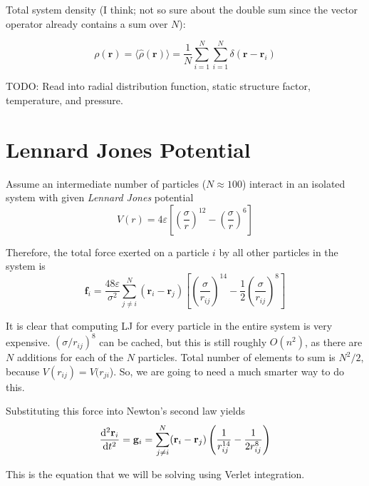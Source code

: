 \documentclass{article}
\begin{document}
Total system density (I think; not so sure about the double sum since the vector operator already contains a sum over $N$):

\begin{equation}
    \rho (\mathbf{r}) = \langle \hat{\rho}(\mathbf{r}) \rangle = \frac{1}{N}\sum_{i=1}^N \sum_{i=1}^N \delta(\mathbf{r} - \mathbf{r}_i)
\end{equation}

TODO: Read into radial distribution function, static structure factor, temperature, and pressure.

\section{Lennard Jones Potential}

Assume an intermediate number of particles ($N\approx 100$) interact in an isolated system with given \textit{Lennard Jones} potential
\begin{equation}
    V(r) = 4\varepsilon \left[ \left( \frac{\sigma}{r} \right)^{12} - \left( \frac{\sigma}{r} \right)^6 \right]
\end{equation}

Therefore, the total force exerted on a particle $i$ by all other particles in the system is
\begin{equation}
    \mathbf{f}_i = \frac{48\varepsilon}{\sigma^2} \sum_{j \neq i}^N (\mathbf{r}_i - \mathbf{r}_j)
    \left[ \left( \frac{\sigma}{r_{ij}} \right)^{14} - \frac{1}{2} \left( \frac{\sigma}{r_{ij}} \right)^8 \right]
\end{equation}

It is clear that computing LJ for every particle in the entire system is very expensive. $(\sigma/r_{ij})^8$ can be cached, but this is still roughly $O(n^2)$, as there are $N$ additions for each of the $N$ particles. Total number of elements to sum is $N^2/2$, because $V(r_{ij}) = V(r_{ji}$). So, we are going to need a much smarter way to do this.

Substituting this force into Newton's second law yields
\begin{equation}
    \dv[2]{\mathbf{r}_i}{t} = \mathbf{g}_i = \sum_{j \neq i}^N (\mathbf{r}_i - \mathbf{r}_j) \left( \frac{1}{r_{ij}^{14}} - \frac{1}{2r_{ij}^8} \right)
\end{equation}

This is the equation that we will be solving using Verlet integration.
\end{document}
